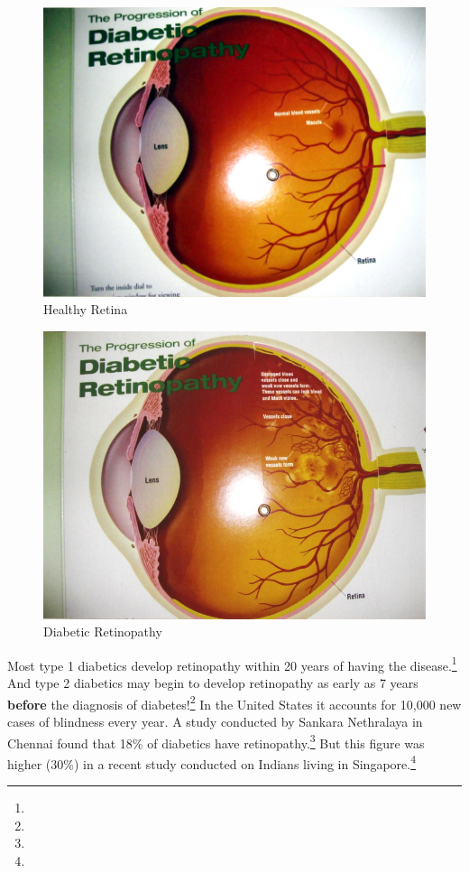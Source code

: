 \begin{figure}
\includegraphics{images/052.jpg}
\caption{Healthy Retina}
\end{figure}


\begin{figure}
\includegraphics{images/053.jpg}
\caption{Diabetic Retinopathy}
\end{figure}

Most type 1 diabetics develop retinopathy within 20 years of having the disease.\footnote{} And type 2 diabetics may begin to develop retinopathy as early as 7 years \textbf{before} the diagnosis of diabetes!\footnote{} In the United States it accounts for 10,000 new cases of blindness every year. A study conducted by Sankara Nethralaya in Chennai found that 18\% of diabetics have retinopathy.\footnote{} But this figure was higher (30\%) in a recent study conducted on Indians living in Singapore.\footnote{}

